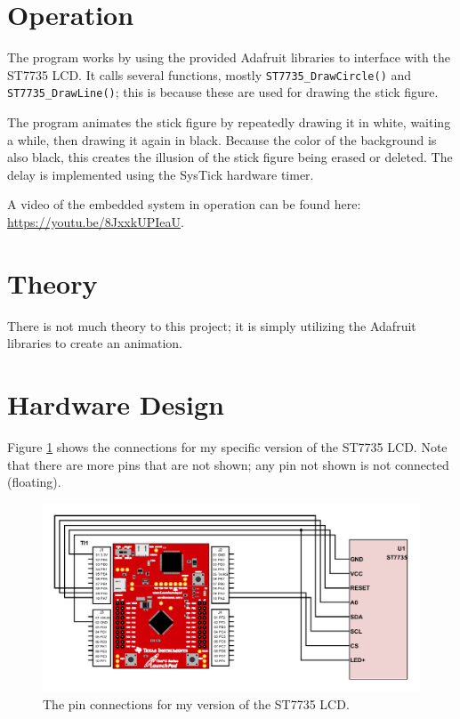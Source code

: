 \documentclass{article}
\renewcommand{\c}[1]{\texttt{#1}}
\begin{document}
\section{Operation}
The program works by using the provided Adafruit libraries
to interface with the ST7735 LCD. It calls several functions,
mostly \c{ST7735\_DrawCircle()} and \c{ST7735\_DrawLine()};
this is because these are used for drawing the stick figure.

The program animates the stick figure by repeatedly drawing
it in white, waiting a while, then drawing it again in black.
Because the color of the background is also black, this
creates the illusion of the stick figure being erased
or deleted. The delay is implemented using the SysTick
hardware timer.

A video of the embedded system in operation can be found
here: \url{https://youtu.be/8JxxkUPIeaU}.

\section{Theory}
There is not much theory to this project; it is simply
utilizing the Adafruit libraries to create an animation.

\section{Hardware Design}
Figure \ref{schematic} shows the connections for my
specific version of the ST7735 LCD. Note that there are
more pins that are not shown; any pin not shown is not
connected (floating).

\begin{figure}[H]
	\centering
	\includegraphics[width=\textwidth]{Images/schemeit-project}
	\caption{The pin connections for my version of the
	ST7735 LCD.}
	\label{schematic}
\end{figure}
\end{document}
